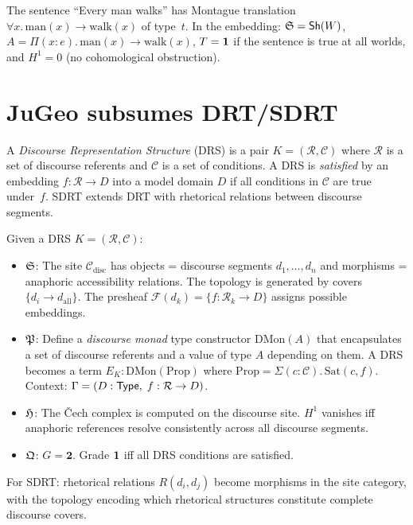 \begin{example}
The sentence ``Every man walks'' has Montague translation
$\forall x.\, \mathrm{man}(x) \to \mathrm{walk}(x)$ of type~$t$.
In the embedding: $\mathfrak{S} = \mathsf{Sh}(W)$, $A = \Pi(x:e).\,
\mathrm{man}(x) \to \mathrm{walk}(x)$, $T = \mathbf{1}$ if the
sentence is true at all worlds, and $H^1 = 0$ (no cohomological
obstruction).
\end{example}

\section{JuGeo subsumes DRT/SDRT}
\label{sec:sub-drt}

\begin{definition}[DRT]
\label{def:drt}
A \emph{Discourse Representation Structure} (DRS) is a pair
$K = (\mathcal{R}, \mathcal{C})$ where $\mathcal{R}$ is a set of
discourse referents and $\mathcal{C}$ is a set of conditions.
A DRS is \emph{satisfied} by an embedding $f : \mathcal{R} \to D$
into a model domain $D$ if all conditions in $\mathcal{C}$ are true
under~$f$.  SDRT extends DRT with rhetorical relations between
discourse segments.
\end{definition}

\begin{construction}
\label{con:drt-embed}
Given a DRS $K = (\mathcal{R}, \mathcal{C})$:
\begin{itemize}[nosep]
\item $\mathfrak{S}$: The site $\mathcal{C}_{\mathrm{disc}}$ has objects =
  discourse segments $d_1, \ldots, d_n$ and morphisms = anaphoric
  accessibility relations.  The topology is generated by covers
  $\{d_i \to d_{\mathrm{all}}\}$.  The presheaf
  $\mathcal{F}(d_k) = \{f : \mathcal{R}_k \to D\}$ assigns
  possible embeddings.

\item $\mathfrak{P}$: Define a \emph{discourse monad} type constructor
  $\mathrm{DMon}(A)$ that encapsulates a set of discourse referents
  and a value of type $A$ depending on them.  A DRS becomes a
  term $E_K : \mathrm{DMon}(\mathrm{Prop})$ where
  $\mathrm{Prop} = \Sigma(c : \mathcal{C}).\, \mathrm{Sat}(c, f)$.
  Context: $\Gamma = (D : \mathsf{Type},\; f : \mathcal{R} \to D)$.

\item $\mathfrak{H}$: The \v{C}ech complex is computed on the discourse
  site.  $H^1$ vanishes iff anaphoric references resolve consistently
  across all discourse segments.

\item $\mathfrak{Q}$: $G = \mathbf{2}$.  Grade $\mathbf{1}$ iff all DRS
  conditions are satisfied.
\end{itemize}
For SDRT: rhetorical relations $R(d_i, d_j)$ become morphisms in the
site category, with the topology encoding which rhetorical structures
constitute complete discourse covers.
\end{construction}


